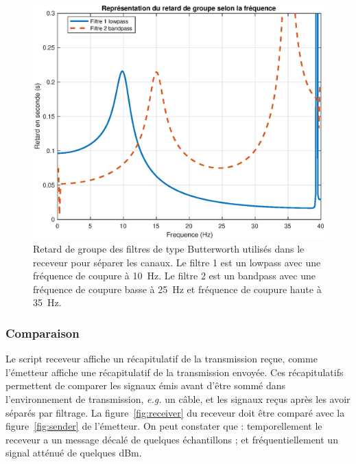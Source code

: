 \documentclass[10pt, oneside, a4paper]{article}
\begin{document}
\begin{figure}[p]
    \centering
    \includegraphics[height=0.45\textheight]{eps/grpdelay.eps}
    \caption{Retard de groupe des filtres de type Butterworth utilisés dans le receveur
             pour séparer les canaux.
             Le filtre 1 est un lowpass avec une fréquence de coupure à \SI{10}{\hertz}.
             Le filtre 2 est un bandpass avec une fréquence de coupure basse à
             \SI{25}{\hertz} et fréquence de coupure haute à \SI{35}{\hertz}.}
    \label{fig:grpdelay}
\end{figure}


\subsubsection{Comparaison}
Le script receveur affiche un récapitulatif de la transmission reçue, comme l'émetteur affiche une récapitulatif de la transmission envoyée.
Ces récapitulatifs permettent de comparer les signaux émis avant d'être sommé dans l'environnement de transmission, \textit{e.g.} un câble, et les signaux reçus après les avoir séparés par filtrage.
La figure~\ref{fig:receiver} du receveur doit être comparé avec la figure~\ref{fig:sender} de l'émetteur.
On peut constater que : temporellement le receveur a un message décalé de quelques échantillons ; et fréquentiellement un signal atténué de quelques dBm.
\end{document}
